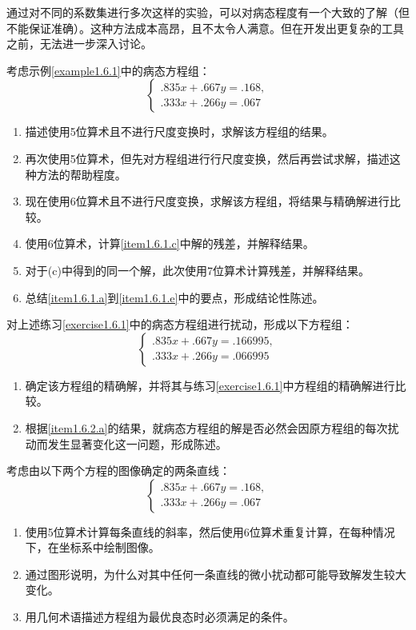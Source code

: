 通过对不同的系数集进行多次这样的实验，可以对病态程度有一个大致的了解（但不能保证准确）。这种方法成本高昂，且不太令人满意。但在开发出更复杂的工具之前，无法进一步深入讨论。

\begin{exercise}
\label{exercise1.6.1}
考虑示例\ref{example1.6.1}中的病态方程组：
$$
\begin{cases} 
.835x + .667y = .168, \\
.333x + .266y = .067
\end{cases}
$$
\begin{enumerate}[label=(\alph*)]
    \item 描述使用5位算术且不进行尺度变换时，求解该方程组的结果。\label{item1.6.1.a}
    \item 再次使用5位算术，但先对方程组进行行尺度变换，然后再尝试求解，描述这种方法的帮助程度。\label{item1.6.1.b}
    \item 现在使用6位算术且不进行尺度变换，求解该方程组，将结果与精确解进行比较。\label{item1.6.1.c}
    \item 使用6位算术，计算\ref{item1.6.1.c}中解的残差，并解释结果。\label{item1.6.1.d}
    \item 对于(c)中得到的同一个解，此次使用7位算术计算残差，并解释结果。\label{item1.6.1.e}
    \item 总结\ref{item1.6.1.a}到\ref{item1.6.1.e}中的要点，形成结论性陈述。
\end{enumerate}
\end{exercise}

\begin{exercise}
对上述练习\ref{exercise1.6.1}中的病态方程组进行扰动，形成以下方程组：
$$
\begin{cases} 
.835x + .667y = .166995, \\
.333x + .266y = .066995
\end{cases}
$$ 
\begin{enumerate}[label=(\alph*)]
    \item 确定该方程组的精确解，并将其与练习\ref{exercise1.6.1}中方程组的精确解进行比较。\label{item1.6.2.a}
    \item 根据\ref{item1.6.2.a}的结果，就病态方程组的解是否必然会因原方程组的每次扰动而发生显著变化这一问题，形成陈述。
\end{enumerate}
\end{exercise}

\begin{exercise}
考虑由以下两个方程的图像确定的两条直线：
$$
\begin{cases} 
.835x + .667y = .168, \\
.333x + .266y = .067
\end{cases}
$$
\begin{enumerate}[label=(\alph*)]
    \item 使用5位算术计算每条直线的斜率，然后使用6位算术重复计算，在每种情况下，在坐标系中绘制图像。
    \item 通过图形说明，为什么对其中任何一条直线的微小扰动都可能导致解发生较大变化。
    \item 用几何术语描述方程组为最优良态时必须满足的条件。
\end{enumerate}
\end{exercise}